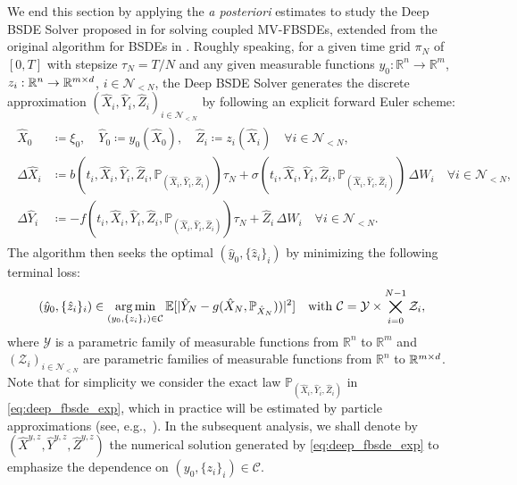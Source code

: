 \documentclass[11pt]{article}
\numberwithin{equation}{section}
\theoremstyle{definition}
\theoremstyle{remark}
\def\to{\rightarrow}
\newcommand{\q}{\quad}   \newcommand{\qq}{\qquad}
\def\l{\label}  \def\f{\frac}  \def\fa{\forall}
\def\cC{\mathcal{C}}
\def\cN{\mathcal{N}}
\def\cY{\mathcal{Y}}
\def\cZ{\mathcal{Z}}
\def\sE{{\mathbb{E}}}
\def\sP{\mathbb{P}}
\def\sR{{\mathbb R}}
\DeclareMathOperator*{\argmin}{arg\,min}
\begin{document}
We end this section 
by applying  the \textit{a posteriori} estimates
to study
the Deep BSDE Solver
proposed in \cite{carmona2019,  fouque2019,germain2019}
for solving  coupled MV-FBSDEs,
extended from the original algorithm for BSDEs in \cite{e2017}.
Roughly speaking,
for a given time grid $\pi_N$  of $[0,T]$ with stepsize $\tau_N=T/N$
and any given 
 measurable functions $y_0:\sR^n\to \sR^m$, $z_i:\sR^n\to \sR^{m\t d}$, $i\in \cN_{<N}$,
the Deep BSDE Solver 
generates the discrete approximation
$(\hat{X}_i,\hat{Y}_i,\hat{Z}_i)_{i\in \cN_{<N}}$ 
 by
following an explicit forward Euler scheme:
\begin{align}\label{eq:deep_fbsde_exp}
\begin{split}
\hat{X}_0&\coloneqq \xi_0, \q \hat{Y}_0\coloneqq y_0(\hat{X}_0), \q \hat{Z}_i\coloneqq z_i(\hat{X}_i) \q  \fa i\in \cN_{<N},
\\
\Delta \hat{X}_i&\coloneqq b(t_{i},\hat{X}_{i},\hat{Y}_{i}, \hat{Z}_{i},\sP_{(\hat{X}_{i},\hat{Y}_{i}, \hat{Z}_{i})})\tau_N  
+\sigma (t_{i},\hat{X}_{i},\hat{Y}_{i}, \hat{Z}_{i},\sP_{(\hat{X}_{i},\hat{Y}_{i}, \hat{Z}_{i})})\, \Delta W_i
\q \fa  i\in \cN_{<N},
\\
\Delta \hat{Y}_i&\coloneqq -f(t_{i},\hat{X}_{i},\hat{Y}_{i}, \hat{Z}_{i}, \sP_{(\hat{X}_{i},\hat{Y}_{i}, \hat{Z}_{i})})\tau_N+\hat{Z}_i\,\Delta W_i
\q \fa i\in \cN_{<N}.
\end{split}
\end{align}
The algorithm then seeks the optimal $(\hat{y}_0,\{\hat{z}_i\}_{i})$ by minimizing the following terminal loss:
$$
(\hat{y}_0,\{\hat{z}_i\}_{i})
\in \argmin_{(y_0,\{z_i\}_{i})\in \cC} \sE[|\hat{Y}_N-g(\hat{X}_N,\sP_{\hat{X}_N}))|^2]
\q \textnormal{with $\cC=\cY \t \bigtimes_{i=0}^{N-1}\cZ_i$},
$$
where
$\cY$ 
 is a  parametric family of measurable functions 
from $\sR^n$ to $\sR^m$
and
 $(\cZ_i)_{i\in \cN_{<N}}$
are parametric families of measurable functions 
from $\sR^n$ to $\sR^{m\t d}$.
Note that  for simplicity
we consider the exact law $\sP_{(\hat{X}_{i},\hat{Y}_{i}, \hat{Z}_{i})}$ in  \eqref{eq:deep_fbsde_exp}, 
which 
in practice will be estimated by
particle approximations (see, e.g.,~\cite{germain2019}).
In the subsequent analysis, 
we shall denote by 
$(\hat{X}^{y,z},\hat{Y}^{y,z},\hat{Z}^{y,z})$
the numerical solution generated by \eqref{eq:deep_fbsde_exp}
to emphasize the dependence on 
$(y_0,\{z_i\}_{i})\in \cC$.
\end{document}
